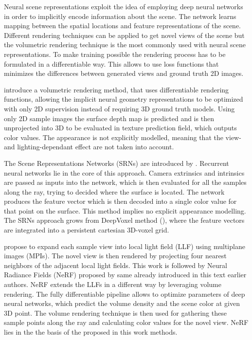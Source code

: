 Neural scene representations exploit the idea of employing
deep neural networks in order to implicitly encode information about the scene.
The network learns mapping between the spatial locations and feature representations of the scene.
Different rendering techniques can be applied to get novel views of the scene
but the volumetric rendering technique is the most commonly used with neural scene representations.
To make training possible the rendering process has to be formulated in a differentiable way.
This allows to use loss functions that minimizes the differences between generated views and ground truth 2D images.

\cite{niemeyer2020differentiable} introduce a volumetric rendering method,
that uses differentiable rendering functions,
allowing the implicit neural geometry representations to be optimized
with only 2D supervision instead of requiring 3D ground truth models.
Using only 2D sample images the surface depth map is predicted
and is then unprojected into 3D to be evaluated in texture prediction field,
which outputs color values.
The appearance is not explicitly modelled, meaning that the view- and lighting-dependant effect are not taken into account.


The Scene Representations Networks (SRNs) are introduced by \cite{sitzmann2019srns}.
Recurrent neural networks lie in the core of this approach.
Camera extrinsics and intrinsics are passed as inputs into the network,
which is then evaluated for all the samples along the ray,
trying to decided where the surface is located.
The network produces the feature vector which is then decoded into a single color value for that point on the surface.
This method implies no explicit appearance modelling.
The SRNs approach grows from DeepVoxel method (\cite{sitzmann2019deepvoxels}),
where the feature vectors are integrated into a persistent cartesian 3D-voxel grid.

\cite{mildenhall2019local} propose to expand each sample view into local light field (LLF) using multiplane images (MPIs).
The novel view is then rendered by projecting four nearest neighbors of the adjacent local light fields.
This work is followed by Neural Radiance Fields (NeRF) \cite{mildenhall2020nerf} proposed by same already introduced in this text earlier authors.
NeRF extends the LLFs in a different way by leveraging volume rendering.
The fully differentiable pipeline allows to optimize parameters of deep neural networks,
which predict the volume density and the scene color at given 3D point.
The volume rendering technique is then used for gathering these sample points along the ray
and calculating color values for the novel view.
NeRF lies in the the basis of the proposed in this work methods.

